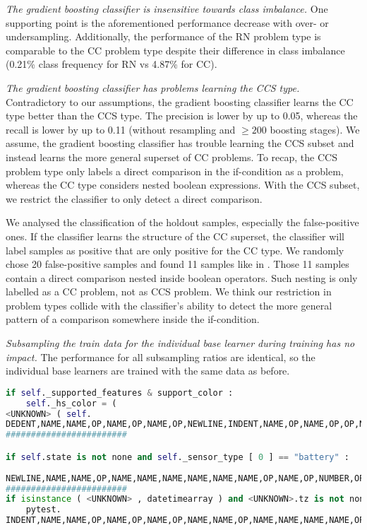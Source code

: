 \textit{The gradient boosting classifier is insensitive towards class imbalance.} One supporting point is the aforementioned performance decrease with over- or undersampling. Additionally, the performance of the RN problem type is comparable to the CC problem type despite their difference in class imbalance (0.21\% class frequency for RN vs 4.87\% for CC). 

\textit{The gradient boosting classifier has problems learning the CCS type.} Contradictory to our assumptions, the gradient boosting classifier learns the CC type better than the CCS type. The precision is lower by up to 0.05, whereas the recall is lower by up to 0.11 (without resampling and $\geq 200$ boosting stages). We assume, the gradient boosting classifier has trouble learning the CCS subset and instead learns the more general superset of CC problems. To recap, the CCS problem type only labels a direct comparison in the if-condition as a problem, whereas the CC type considers nested boolean expressions. With the CCS subset, we restrict the classifier to only detect a direct comparison. 

We analysed the classification of the holdout samples, especially the false-positive ones. If the classifier learns the structure of the CC superset, the classifier will label samples as positive that are only positive for the CC type. We randomly chose 20 false-positive samples and found 11 samples like in . Those 11 samples contain a direct comparison nested inside boolean operators. Such nesting is only labelled as a CC problem, not as CCS problem. We think our restriction in problem types collide with the classifier's ability to detect the more general pattern of a comparison somewhere inside the if-condition.


\textit{Subsampling the train data for the individual base learner during training has no impact.} The performance for all subsampling ratios are identical, so the individual base learners are trained with the same data as before.


\begin{lstlisting}[float=t, language=Python, label=lst:gbc_false_positive, caption={False-positive samples for the best performing \high{gradient boosting classifier} with 300 boosting stages, a learning rate of 0.2, type encoding and without resampling for the CCS type. We removed spaces between tokens if necessary, but leave the indentation as in the sample.}]
    if self._supported_features & support_color : 
    self._hs_color = ( 
<UNKNOWN> ( self.
DEDENT,NAME,NAME,OP,NAME,OP,NAME,OP,NEWLINE,INDENT,NAME,OP,NAME,OP,OP,NL,NAME,OP,NAME,OP
########################

if self.state is not none and self._sensor_type [ 0 ] == "battery" : 
   
NEWLINE,NAME,NAME,OP,NAME,NAME,NAME,NAME,NAME,NAME,OP,NAME,OP,NUMBER,OP,OP,STRING,OP,NEWLINE,INDENT
########################
if isinstance ( <UNKNOWN> , datetimearray ) and <UNKNOWN>.tz is not none : 
    pytest.
INDENT,NAME,NAME,OP,NAME,OP,NAME,OP,NAME,NAME,OP,NAME,NAME,NAME,NAME,OP,NEWLINE,INDENT,NAME,OP
\end{lstlisting}

